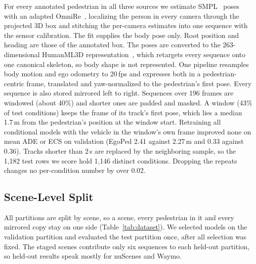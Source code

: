 \documentclass[letterpaper, 10 pt, conference]{ieeeconf}
\newcommand{\method}{EgoPed\xspace}
\begin{document}
For every annotated pedestrian in all three sources we estimate SMPL~\cite{SMPL:2015} poses with an adapted OmniRe~\cite{chen2025omnire}, localizing the person in every camera through the projected 3D box and stitching the per-camera estimates into one sequence with the sensor calibration. The fit supplies the body pose only. Root position and heading are those of the annotated box.
The poses are converted to the 263-dimensional HumanML3D representation~\cite{guo2022humanml3d}, which retargets every sequence onto one canonical skeleton, so body shape is not represented.
One pipeline resamples body motion and ego odometry to 20\,fps and expresses both in a pedestrian-centric frame, translated and yaw-normalized to the pedestrian's first pose.
Every sequence is also stored mirrored left to right.
Sequences over 196 frames are windowed (about 40\%) and shorter ones are padded and masked. A window (43\% of test conditions) keeps the frame of its track's first pose, which lies a median 1.7\,m from the pedestrian's position at the window start. Retraining all conditional models with the vehicle in the window's own frame improved none on mean ADE or ECS on validation (\method 2.41 against 2.27\,m and 0.33 against 0.36). Tracks shorter than 2\,s are replaced by the neighboring sample, so the 1{,}182 test rows we score hold 1{,}146 distinct conditions. Dropping the repeats changes no per-condition number by over 0.02.

\subsection{Scene-Level Split}

All partitions are split by scene, so a scene, every pedestrian in it and every mirrored copy stay on one side (Table~\ref{tab:dataset}).
We selected models on the validation partition and evaluated the test partition once, after all selection was fixed.
The staged scenes contribute only six sequences to each held-out partition, so held-out results speak mostly for nuScenes and Waymo.
\end{document}
